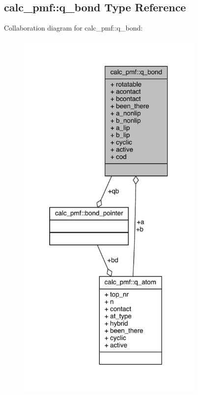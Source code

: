 \hypertarget{structcalc__pmf_1_1q__bond}{\subsection{calc\-\_\-pmf\-:\-:q\-\_\-bond Type Reference}
\label{structcalc__pmf_1_1q__bond}
}


Collaboration diagram for calc\-\_\-pmf\-:\-:q\-\_\-bond\-:
\nopagebreak
\begin{figure}[H]
\begin{center}
\leavevmode
\includegraphics[width=260pt]{structcalc__pmf_1_1q__bond__coll__graph}
\end{center}
\end{figure}
